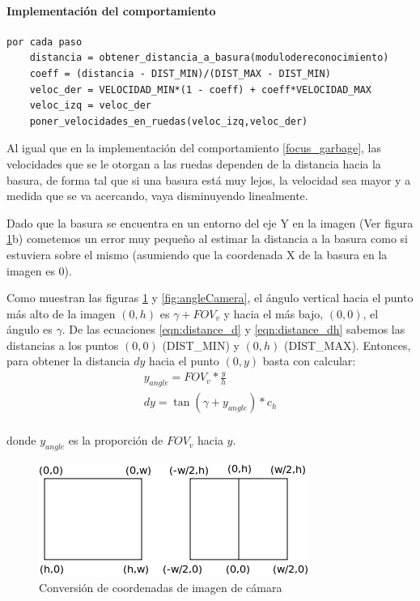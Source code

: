 \paragraph{Implementaci\'on del comportamiento}
\begin{verbatim}
por cada paso
    distancia = obtener_distancia_a_basura(modulodereconocimiento)
    coeff = (distancia - DIST_MIN)/(DIST_MAX - DIST_MIN)
    veloc_der = VELOCIDAD_MIN*(1 - coeff) + coeff*VELOCIDAD_MAX
    veloc_izq = veloc_der
    poner_velocidades_en_ruedas(veloc_izq,veloc_der)
\end{verbatim}

Al igual que en la implementaci\'on del comportamiento \ref{focus_garbage},
las velocidades que se le otorgan a las ruedas dependen de la distancia
hacia la basura, de forma tal que si una basura est\'a muy lejos, la velocidad
sea mayor y a medida que se va acercando, vaya disminuyendo linealmente.

Dado que la basura se encuentra en un entorno del eje Y en la imagen (Ver figura
\ref{fig:image_coord_conv}b) cometemos un error muy peque\~no al estimar la distancia
a la basura como si estuviera sobre el mismo (asumiendo que la coordenada X de la
basura en la imagen es 0).

Como muestran las figuras \ref{fig:image_coord_conv} y \ref{fig:angleCamera},
el \'angulo vertical hacia el punto m\'as alto de la imagen $(0,h)$ es 
$\gamma+FOV_v$ y hacia el m\'as bajo, $(0,0)$, el \'angulo es $\gamma$.
De las ecuaciones \eqref{eqn:distance_d} y \eqref{eqn:distance_dh} sabemos
las distancias a los puntos $(0,0)$ (DIST\_MIN) y $(0,h)$ (DIST\_MAX). 
Entonces, para obtener la distancia $dy$ hacia el punto $(0,y)$ basta con
calcular:
\begin{eqnarray}
y_{angle} = FOV_v * \frac{y}{h} \\
dy = \tan(\gamma + y_{angle}) * c_h \\
\end{eqnarray}

donde $y_{angle}$ es la proporci\'on de $FOV_v$ hacia $y$.
\begin{figure}[htp]
\begin{center}
\includegraphics[scale=0.5]{comportamientos/imageCoordsConvertion.png}
\caption{Conversi\'on de coordenadas de imagen de c\'amara}
\label{fig:image_coord_conv}
\end{center}
\end{figure}

